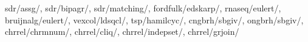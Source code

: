 sdr/assg/,
sdr/bipagr/,
sdr/matching/,
fordfulk/edskarp/,
rnaseq/eulert/,
bruijnalg/eulert/,
vexcol/ldsqcl/,
tsp/hamilcyc/,
cngbrh/sbgiv/,
ongbrh/sbgiv/,
chrrel/chrmnum/,
chrrel/cliq/,
chrrel/indepset/,
chrrel/grjoin/